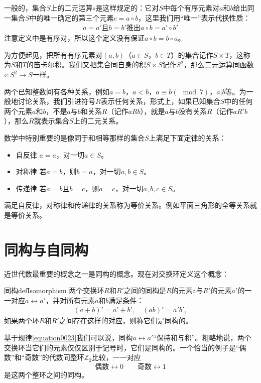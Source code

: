 一般的，集合$S$上的二元运算$\circ$是这样规定的：它对$S$中每个有序元素对$a$和$b$给出同一集合$S$中的唯一确定的第三个元素$c=a \circ b$，这里我们用“唯一”表示代换性质：
\begin{gather}\label{equation0022}
a=a'\text{且}b=b'\text{推出}a \circ b = a' \circ b'
\end{gather}
注意定义中是有序对，所以这个定义没有保证$a \circ b = b \circ a$。

为方便起见，把所有有序元素对$(a, b)$（$a \in S$，$b \in T$）的集合记作$S \times T$，这称为$S$和$T$的笛卡尔积。我们又把集合同自身的积$S \times S$记作$S^2$，那么二元运算同函数$\circ: S^2 \to S$一样。

两个已知整数间有各种关系，例如$a=b$，$a<b$，$a \equiv b(\mod{7})$，$a|b$等。为一般地讨论关系，我们引进符号$R$表示任何关系，形式上，如果已知集合$S$中的任何两个元素$a$和$b$，不是$a$与$b$和关系$R$（记作$aRb$），就是$a$与$b$没有关系$R$（记作$aR'b$），那么$R$就表示集合$S$上的二元关系。

数学中特别重要的是像同于和相等那样的集合$S$上满足下面定律的关系：
\begin{itemize}
\item 自反律 $a=a$，对一切$a \in S$。
\item 对称律 若$a=b$，则$b=a$，对一切$a, b \in S$。
\item 传递律 若$a=b$且$b=c$，则$a=c$，对一切$a, b, c \in S$。
\end{itemize}
满足自反律，对称律和传递律的关系称为等价关系。例如平面三角形的全等关系就是等价关系。


\section{同构与自同构}\label{subsection0010112}
近世代数最重要的概念之一是同构的概念。现在对交换环定义这个概念：
\begin{definition}{同构}{defIsomorphism}
两个交换环$R$和$R'$之间的同构是$R$的元素a与$R'$的元素$a'$的一一对应$a \leftrightarrow a'$，并对所有元素$a$和$b$满足条件：
\begin{gather}\label{equation0023}
(a+b)'=a'+b',\quad (ab)'=a'b',
\end{gather}
如果两个环$R$和$R'$之间存在这样的对应，则称它们是同构的。
\end{definition}
基于规律\ref{equation0023}我们可以说，同构$a \leftrightarrow a'$“保持和与积”。粗略地说，两个交换环当它们的元素仅仅区别于记号时，它们是同构的。一个恰当的例子是“偶数”和“奇数”的代数同整环$\mathbb{Z}_2$比较，一一对应
\[
\text{偶数}\leftrightarrow 0 \quad\quad \text{奇数}\leftrightarrow 1
\]
是这两个整环之间的同构。

